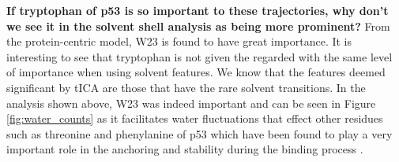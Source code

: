 \textbf{If tryptophan of p53 is so important to these trajectories, why don't we see it in the solvent shell analysis as being more prominent?}  From the protein-centric model, W23 is found to have great importance.  It is interesting to see that tryptophan is not given the regarded with the same level of importance  when using solvent features. We know that the features deemed significant by tICA are those that have the rare solvent transitions.  In the analysis shown above, W23 was indeed important and can be seen in Figure \ref{fig:water_counts} as it facilitates water fluctuations that effect other residues such as threonine and phenylanine of p53 which have been found to play a very important role in the anchoring and stability during the binding process \cite{zwier2016efficient}.














